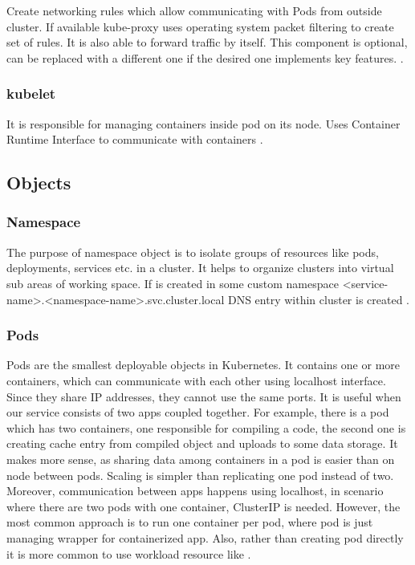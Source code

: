 Create networking rules which allow communicating with Pods from outside cluster. If available kube-proxy uses operating system packet filtering to create set of rules. It is also able to forward traffic by itself. This component is optional, can be replaced with a different one if the desired one implements key features. \cite{KubernetesArch}.


\subsubsection{kubelet}
\label{sec:kubelet}

It is responsible for managing containers inside pod on its node. Uses Container Runtime Interface to communicate with containers \cite{KubernetesArch} \cite{KubernetesCRI}.


\subsection{Objects}    
\label{sec:k8s_objects}

\subsubsection{Namespace}
\label{sec:namespace}

The purpose of namespace object is to isolate groups of resources like pods, deployments, services etc. in a cluster. It helps to organize clusters into virtual sub areas of working space. If \textit{} is created in some custom namespace <service-name>.<namespace-name>.svc.cluster.local DNS entry within cluster is created \cite{KubernetesNamespaces}.

\subsubsection{Pods}
\label{sec:pods}

Pods are the smallest deployable objects in Kubernetes. It contains one or more containers, which can communicate with each other using localhost interface. Since they share IP addresses, they cannot use the same ports. It is useful when our service consists of two apps coupled together. For example, there is a pod which has two containers, one responsible for compiling a code, the second one is creating cache entry from compiled object and uploads to some data storage. It makes more sense, as sharing data among containers in a pod is easier than on node between pods. Scaling is simpler than replicating one pod instead of two. Moreover, communication between apps happens using localhost, in scenario where there are two pods with one container, ClusterIP \textit{} is needed. However, the most common approach is to run one container per pod, where pod is just managing wrapper for containerized app. Also, rather than creating pod directly it is more common to use workload resource like \textit{} \cite{KubernetesPods}. 


